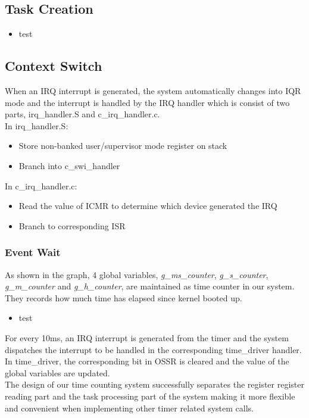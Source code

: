 \documentclass{article}
\begin{document}
\subsection{Task Creation}
\begin{itemize}
	\setlength{\itemsep}{1pt}
	\setlength{\parskip}{0pt}
	\setlength{\parsep}{0pt}
	\item test
\end{itemize}

\subsection{Context Switch}
When an IRQ interrupt is generated, the system automatically changes into IQR mode and the interrupt is handled by the IRQ handler which is consist of two parts, irq\_handler.S and c\_irq\_handler.c.\\
In irq\_handler.S:
	 \begin{itemize}
	  \setlength{\itemsep}{1pt}
	  \setlength{\parskip}{0pt}
	  \setlength{\parsep}{0pt}
	\item Store non-banked user/supervisor mode register on stack
	\item Branch into c\_swi\_handler
	\end{itemize}
In c\_irq\_handler.c:
	\begin{itemize}
	  \setlength{\itemsep}{1pt}
	  \setlength{\parskip}{0pt}
	  \setlength{\parsep}{0pt}
	\item Read the value of ICMR to determine which device generated the IRQ 
	\item Branch to corresponding ISR
\end{itemize}

\subsubsection{Event Wait}	
As shown in the graph, 4 global variables, {\it g\_ms\_counter}, {\it g\_s\_counter}, {\it g\_m\_counter} and {\it g\_h\_counter}, are maintained as time counter in our system. They records how much time has elapsed since kernel booted up. 
 \begin{itemize}
	  \setlength{\itemsep}{1pt}
	  \setlength{\parskip}{0pt}
	  \setlength{\parsep}{0pt}
	  \item test
\end{itemize}

For every 10ms, an IRQ interrupt is generated from the timer and the system dispatches the interrupt to be handled in the corresponding time\_driver handler. In time\_driver, the corresponding bit in OSSR is cleared and the value of the global variables are updated.\\
\newline
The design of our time counting system successfully separates the register register reading part and the task processing part of the system making it more flexible and convenient when implementing other timer related system calls.
\newline
\end{document}
